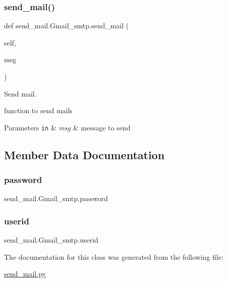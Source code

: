 \subsubsection{\texorpdfstring{send\+\_\+mail()}{send\_mail()}}
{\footnotesize\ttfamily def send\+\_\+mail.\+Gmail\+\_\+smtp.\+send\+\_\+mail (\begin{DoxyParamCaption}\item[{}]{self,  }\item[{}]{msg }\end{DoxyParamCaption})}



Send mail. 

function to send mails


\begin{DoxyParams}[1]{Parameters}
\mbox{\tt in}  & {\em msg} & message to send \\
\hline
\end{DoxyParams}


\subsection{Member Data Documentation}
\mbox{\label{classsend__mail_1_1Gmail__smtp_a9701290209cdd9f389fc94c0a0ac0019}} 
\subsubsection{\texorpdfstring{password}{password}}
{\footnotesize\ttfamily send\+\_\+mail.\+Gmail\+\_\+smtp.\+password}

\mbox{\label{classsend__mail_1_1Gmail__smtp_a0955e443227792ac46cf043b6a92af2c}} 
\subsubsection{\texorpdfstring{userid}{userid}}
{\footnotesize\ttfamily send\+\_\+mail.\+Gmail\+\_\+smtp.\+userid}



The documentation for this class was generated from the following file\+:\begin{DoxyCompactItemize}
\item 
\hyperlink{send__mail_8py}{send\+\_\+mail.\+py}\end{DoxyCompactItemize}
